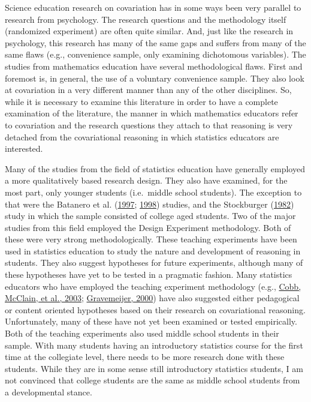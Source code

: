 \documentclass[11pt]{umnthesis}
\begin{document}
Science education research on covariation has in some ways been very parallel to research from psychology. The research questions and the methodology itself (randomized experiment) are often quite similar. And, just like the research in psychology, this research has many of the same gaps and suffers from many of the same flaws (e.g., convenience sample, only examining dichotomous variables). The studies from mathematics education have several methodological flaws. First and foremost is, in general, the use of a voluntary convenience sample. They also look at covariation in a very different manner than any of the other disciplines. So, while it is necessary to examine this literature in order to have a complete examination of the literature, the manner in which mathematics educators refer to covariation and the research questions they attach to that reasoning is very detached from the covariational reasoning in which statistics educators are interested.

Many of the studies from the field of statistics education have generally employed a more qualitatively based research design. They also have examined, for the most part, only younger students (i.e.~middle school students). The exception to that were the Batanero et al. (\protect\hyperlink{ref-batanero:1997}{1997}; \protect\hyperlink{ref-batanero:1998}{1998}) studies, and the Stockburger (\protect\hyperlink{ref-stockburger:1982}{1982}) study in which the sample consisted of college aged students. Two of the major studies from this field employed the Design Experiment methodology. Both of these were very strong methodologically. These teaching experiments have been used in statistics education to study the nature and development of reasoning in students. They also suggest hypotheses for future experiments, although many of these hypotheses have yet to be tested in a pragmatic fashion. Many statistics educators who have employed the teaching experiment methodology (e.g., \protect\hyperlink{ref-cobb:2003a}{Cobb, McClain, et al., 2003}; \protect\hyperlink{ref-gravemeijer:2000}{Gravemeijer, 2000}) have also suggested either pedagogical or content oriented hypotheses based on their research on covariational reasoning. Unfortunately, many of these have not yet been examined or tested empirically. Both of the teaching experiments also used middle school students in their sample. With many students having an introductory statistics course for the first time at the collegiate level, there needs to be more research done with these students. While they are in some sense still introductory statistics students, I am not convinced that college students are the same as middle school students from a developmental stance.
\end{document}
